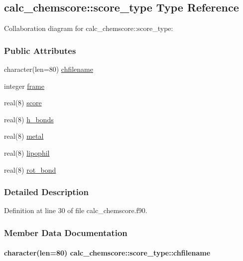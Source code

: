 \hypertarget{structcalc__chemscore_1_1score__type}{\subsection{calc\-\_\-chemscore\-:\-:score\-\_\-type Type Reference}
\label{structcalc__chemscore_1_1score__type}
}


Collaboration diagram for calc\-\_\-chemscore\-:\-:score\-\_\-type\-:
\subsubsection*{Public Attributes}
\begin{DoxyCompactItemize}
\item 
character(len=80) \hyperlink{structcalc__chemscore_1_1score__type_a6d356f21f833fb8a993132fafce94fbd}{chfilename}
\item 
integer \hyperlink{structcalc__chemscore_1_1score__type_a5e6eea1dc22a81b39f2f631c9c71ad80}{frame}
\item 
real(8) \hyperlink{structcalc__chemscore_1_1score__type_ab653acb22618b073d6f5912c97ea6109}{score}
\item 
real(8) \hyperlink{structcalc__chemscore_1_1score__type_a42510c078a0421d5315ea9643fb5550e}{h\-\_\-bonds}
\item 
real(8) \hyperlink{structcalc__chemscore_1_1score__type_a68dfbf6bcecd3234b372b142f21dfdc9}{metal}
\item 
real(8) \hyperlink{structcalc__chemscore_1_1score__type_a9cc42cf22a9a010f4e77daf6a4cb3491}{lipophil}
\item 
real(8) \hyperlink{structcalc__chemscore_1_1score__type_a06b967473b197c05a0a3d25d5b864e50}{rot\-\_\-bond}
\end{DoxyCompactItemize}


\subsubsection{Detailed Description}


Definition at line 30 of file calc\-\_\-chemscore.\-f90.



\subsubsection{Member Data Documentation}
\hypertarget{structcalc__chemscore_1_1score__type_a6d356f21f833fb8a993132fafce94fbd}{
\paragraph[{chfilename}]{\setlength{\rightskip}{0pt plus 5cm}character(len=80) calc\-\_\-chemscore\-::score\-\_\-type\-::chfilename}}\label{structcalc__chemscore_1_1score__type_a6d356f21f833fb8a993132fafce94fbd}


